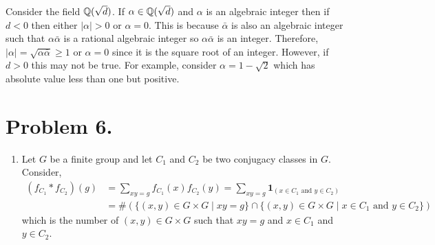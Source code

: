 \documentclass[12pt]{extarticle}
\begin{document}
Consider the field $\mathbb{Q}(\sqrt{d})$. If $\alpha \in \mathbb{Q}(\sqrt{d})$ and $\alpha$ is an algebraic integer then if $d < 0$ then either $|\alpha| > 0$ or $\alpha = 0$. This is because $\bar{\alpha}$ is also an algebraic integer such that $\alpha \bar{\alpha}$ is a rational algebraic integer so $\alpha \bar{\alpha}$ is an integer. Therefore, $|\alpha| = \sqrt{\alpha \bar{\alpha}} \ge 1$ or $\alpha = 0$ since it is the square root of an integer. However, if $d > 0$ this may not be true. For example, consider $\alpha = 1 - \sqrt{2}$ which has absolute value less than one but positive.

\section*{Problem 6.}

\begin{enumerate}
\item Let $G$ be a finite group and let $C_1$ and $C_2$ be two conjugacy classes in $G$. Consider,
\begin{align*}
(f_{C_1} * f_{C_2})(g) & = \sum_{xy = g} f_{C_1}(x) f_{C_2}(y) = \sum_{xy = g} \mathbf{1}_{(x \in C_1 \text{ and } y \in C_2)}
\\
& = \#(\{(x, y) \in G \times G \mid xy = g \} \cap \{ (x, y) \in G \times G \mid x \in C_1 \text{ and } y \in C_2 \} )
\end{align*}
which is the number of $(x, y) \in G \times G$ such that $xy = g$ and $x \in C_1$ and $y \in C_2$. 


\end{enumerate}
\end{document}

